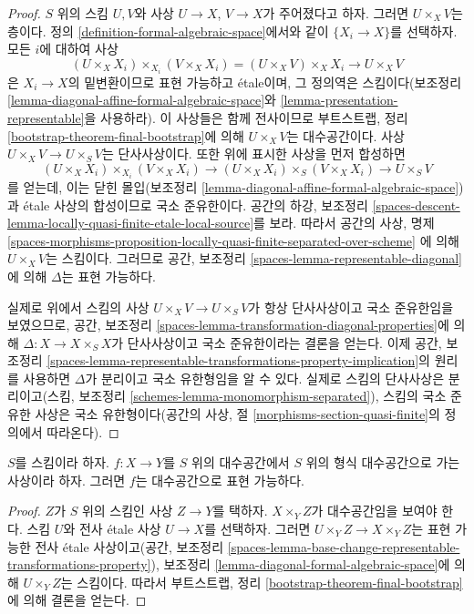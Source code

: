 \begin{proof}
$S$ 위의 스킴 $U, V$와 사상 $U \to X$, $V \to X$가 주어졌다고
하자. 그러면 $U \times_X V$는 층이다. 정의
\ref{definition-formal-algebraic-space}에서와 같이
$\{X_i \to X\}$를 선택하자. 모든 $i$에 대하여 사상
$$
(U \times_X X_i) \times_{X_i} (V \times_X X_i)
= (U \times_X V) \times_X X_i \to U \times_X V
$$
은 $X_i \to X$의 밑변환이므로 표현 가능하고 \'etale이며,
그 정의역은 스킴이다(보조정리
\ref{lemma-diagonal-affine-formal-algebraic-space}와
\ref{lemma-presentation-representable}을 사용하라). 이 사상들은
함께 전사이므로 부트스트랩, 정리
\ref{bootstrap-theorem-final-bootstrap}에 의해
$U \times_X V$는 대수공간이다. 사상
$U \times_X V \to U \times_S V$는 단사사상이다. 또한 위에 표시한
사상을 먼저 합성하면
$$
(U \times_X X_i) \times_{X_i} (V \times_X X_i)
\to (U \times_X X_i) \times_S (V \times_X X_i)
\to U \times_S V
$$
를 얻는데, 이는 닫힌 몰입(보조정리
\ref{lemma-diagonal-affine-formal-algebraic-space})과 \'etale
사상의 합성이므로 국소 준유한이다. 공간의 하강, 보조정리
\ref{spaces-descent-lemma-locally-quasi-finite-etale-local-source}를
보라. 따라서 공간의 사상, 명제
\ref{spaces-morphisms-proposition-locally-quasi-finite-separated-over-scheme}
에 의해 $U \times_X V$는 스킴이다. 그러므로 공간, 보조정리
\ref{spaces-lemma-representable-diagonal}에 의해 $\Delta$는 표현
가능하다.

\medskip\noindent
실제로 위에서 스킴의 사상 $U \times_X V \to U \times_S V$가
항상 단사사상이고 국소 준유한임을 보였으므로, 공간, 보조정리
\ref{spaces-lemma-transformation-diagonal-properties}에 의해
$\Delta : X \to X \times_S X$가 단사사상이고 국소 준유한이라는
결론을 얻는다. 이제 공간, 보조정리
\ref{spaces-lemma-representable-transformations-property-implication}의
원리를 사용하면 $\Delta$가 분리이고 국소 유한형임을 알 수 있다.
실제로 스킴의 단사사상은 분리이고(스킴, 보조정리
\ref{schemes-lemma-monomorphism-separated}), 스킴의 국소 준유한
사상은 국소 유한형이다(공간의 사상, 절
\ref{morphisms-section-quasi-finite}의 정의에서 따라온다).
\end{proof}

\begin{lemma}
\label{lemma-space-to-formal-space}
$S$를 스킴이라 하자. $f : X \to Y$를 $S$ 위의 대수공간에서
$S$ 위의 형식 대수공간으로 가는 사상이라 하자. 그러면 $f$는
대수공간으로 표현 가능하다.
\end{lemma}

\begin{proof}
$Z$가 $S$ 위의 스킴인 사상 $Z \to Y$를 택하자. $X \times_Y Z$가
대수공간임을 보여야 한다. 스킴 $U$와 전사 \'etale 사상
$U \to X$를 선택하자. 그러면
$U \times_Y Z \to X \times_Y Z$는 표현 가능한 전사 \'etale
사상이고(공간, 보조정리
\ref{spaces-lemma-base-change-representable-transformations-property}),
보조정리 \ref{lemma-diagonal-formal-algebraic-space}에 의해
$U \times_Y Z$는 스킴이다. 따라서 부트스트랩, 정리
\ref{bootstrap-theorem-final-bootstrap}에 의해 결론을 얻는다.
\end{proof}


